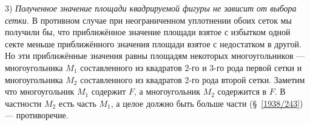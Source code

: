 {3) \emph{Полученное значение площади квадрируемой фигуры не зависит от выбора сетки.}
В противном случае при неограниченном уплотнении обоих сеток мы получили бы, что
приближённое значение площади взятое с избытком одной секте меньше 
приближённого значения площади взятое с недостатком в другой.
Но эти приближённые значения равны площадям некоторых многоугольников — многоугольника $M_1$ составленного из квадратов 2-го и 3-го рода первой сетки 
и многоугольника $M_2$ составленного из квадратов 2-го рода второй сетки.
Заметим что многоугольник $M_1$ содержит $F$, а многоугольник $M_2$ содержится в $F$.
В частности $M_2$ есть часть $M_1$, а целое должно быть больше части (§~\ref{1938/243}) — противоречие.

}

